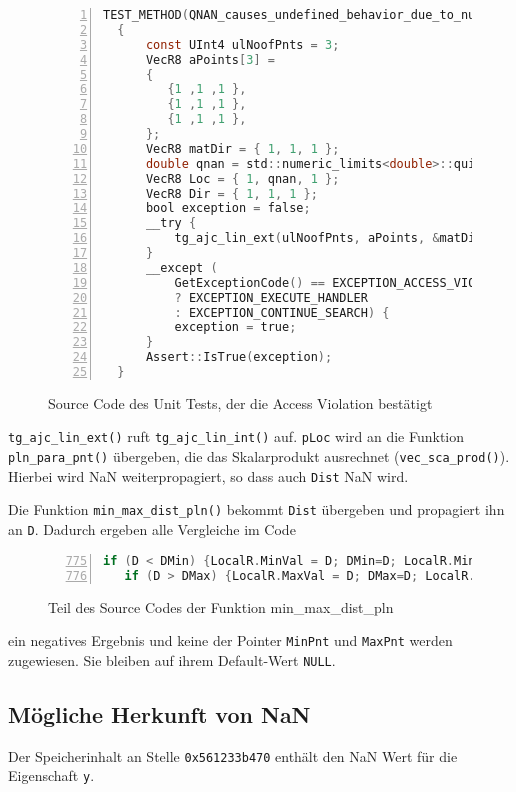 \begin{figure}[H]
\begin{lstlisting}[language=C,  numbers=left]
  TEST_METHOD(QNAN_causes_undefined_behavior_due_to_nullpointer_dereferencing)
  {
      const UInt4 ulNoofPnts = 3;
      VecR8 aPoints[3] =
      {
         {1 ,1 ,1 },
         {1 ,1 ,1 },
         {1 ,1 ,1 },
      };
      VecR8 matDir = { 1, 1, 1 };
      double qnan = std::numeric_limits<double>::quiet_NaN();
      VecR8 Loc = { 1, qnan, 1 };
      VecR8 Dir = { 1, 1, 1 };
      bool exception = false;
      __try {
          tg_ajc_lin_ext(ulNoofPnts, aPoints, &matDir, &Loc, &Dir, True, True);
      }
      __except (
          GetExceptionCode() == EXCEPTION_ACCESS_VIOLATION
          ? EXCEPTION_EXECUTE_HANDLER
          : EXCEPTION_CONTINUE_SEARCH) {
          exception = true;
      }
      Assert::IsTrue(exception);
  }
\end{lstlisting}
\caption{Source Code des Unit Tests, der die Access Violation bestätigt}
\end{figure}

\verb|tg_ajc_lin_ext()| ruft \verb|tg_ajc_lin_int()| auf. \verb|pLoc| wird an die Funktion \verb|pln_para_pnt()| übergeben, die das Skalarprodukt ausrechnet (\verb|vec_sca_prod()|).
Hierbei wird NaN weiterpropagiert, so dass auch \verb|Dist| NaN wird.

Die Funktion \verb|min_max_dist_pln()| bekommt \verb|Dist| übergeben und propagiert ihn an \verb|D|. Dadurch ergeben alle Vergleiche im Code

\begin{figure}[H]
\begin{lstlisting}[language=C, numbers=left, firstnumber=775]
   if (D < DMin) {LocalR.MinVal = D; DMin=D; LocalR.MinPnt = &aPoints[i];}
   if (D > DMax) {LocalR.MaxVal = D; DMax=D; LocalR.MaxPnt = &aPoints[i];} 
\end{lstlisting}
\caption{Teil des Source Codes der Funktion min\_max\_dist\_pln}
\end{figure}

ein negatives Ergebnis und keine der Pointer \verb|MinPnt| und \verb|MaxPnt| werden zugewiesen. Sie bleiben auf ihrem Default-Wert \verb|NULL|.

\subsection{Mögliche Herkunft von NaN}

Der Speicherinhalt an Stelle \verb|0x561233b470| enthält den NaN Wert für die Eigenschaft \verb|y|.


